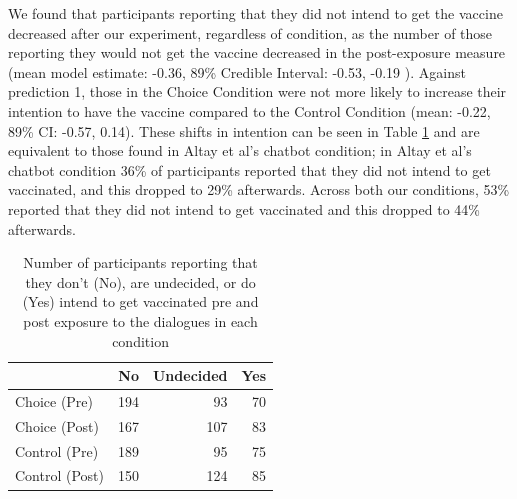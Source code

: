 \documentclass[
  english,
  ,jou,floatsintext]{apa6}
\begin{document}
We found that participants reporting that they did not intend to get the vaccine decreased after our experiment, regardless of condition, as the number of those reporting they would not get the vaccine decreased in the post-exposure measure (mean model estimate: -0.36, 89\% Credible Interval: -0.53, -0.19 ). Against prediction 1, those in the Choice Condition were not more likely to increase their intention to have the vaccine compared to the Control Condition (mean: -0.22, 89\% CI: -0.57, 0.14). These shifts in intention can be seen in Table \ref{tab:intchange} and are equivalent to those found in Altay et al's chatbot condition; in Altay et al's chatbot condition 36\% of participants reported that they did not intend to get vaccinated, and this dropped to 29\% afterwards. Across both our conditions, 53\% reported that they did not intend to get vaccinated and this dropped to 44\% afterwards.

\begin{table}

\caption{\label{tab:intchange}Number of participants reporting that they don't (No), are undecided, or do (Yes) intend to get vaccinated pre and post exposure to the dialogues in each condition}
\centering
\begin{tabular}[t]{l|r|r|r}
\hline
  & No & Undecided & Yes\\
\hline
Choice (Pre) & 194 & 93 & 70\\
\hline
Choice (Post) & 167 & 107 & 83\\
\hline
Control (Pre) & 189 & 95 & 75\\
\hline
Control (Post) & 150 & 124 & 85\\
\hline
\end{tabular}
\end{table}
\end{document}
